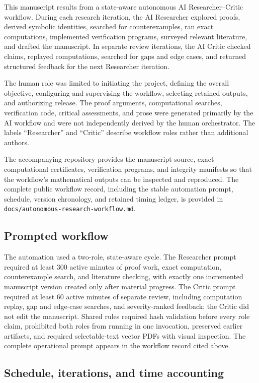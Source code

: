 \documentclass[11pt]{article}
\theoremstyle{remark}
\numberwithin{equation}{section}
\begin{document}
This manuscript results from a state-aware autonomous AI Researcher--Critic
workflow.  During each research iteration, the AI Researcher explored proofs,
derived symbolic identities, searched for counterexamples, ran exact
computations, implemented verification programs, surveyed relevant literature,
and drafted the manuscript.  In separate review iterations, the AI Critic
checked claims, replayed computations, searched for gaps and edge cases, and
returned structured feedback for the next Researcher iteration.

The human role was limited to initiating the project, defining the overall
objective, configuring and supervising the workflow, selecting retained
outputs, and authorizing release.  The proof arguments, computational searches,
verification code, critical assessments, and prose were generated primarily by
the AI workflow and were not independently derived by the human orchestrator.
The labels ``Researcher'' and ``Critic'' describe workflow roles rather than
additional authors.

The accompanying repository provides the manuscript source, exact
computational certificates, verification programs, and integrity manifests so
that the workflow's mathematical outputs can be inspected and reproduced.
The complete public workflow record, including the stable automation prompt,
schedule, version chronology, and retained timing ledger, is provided in
\texttt{docs/autonomous-research-workflow.md}.

\subsection*{Prompted workflow}

The automation used a two-role, state-aware cycle.  The Researcher prompt
required at least 300 active minutes of proof work, exact computation,
counterexample search, and literature checking, with exactly one incremented
manuscript version created only after material progress.  The Critic prompt
required at least 60 active minutes of separate review, including computation
replay, gap and edge-case searches, and severity-ranked feedback; the Critic did
not edit the manuscript.  Shared rules required hash validation before every
role claim, prohibited both roles from running in one invocation, preserved
earlier artifacts, and required selectable-text vector PDFs with visual
inspection.  The complete operational prompt appears in the workflow record
cited above.

\subsection*{Schedule, iterations, and time accounting}
\end{document}
